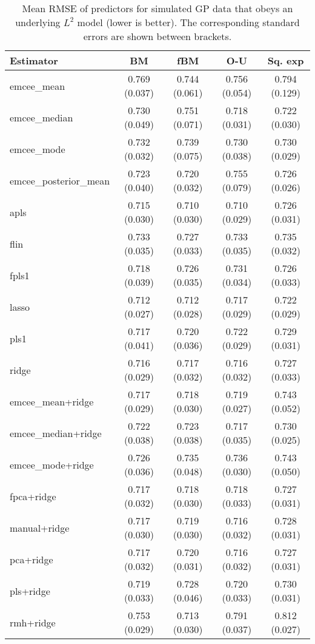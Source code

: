 \newpage

\begin{table}[htbp!]
  \centering
  \begin{tabular}{lcccc}
\toprule
            \textbf{Estimator} &            \textbf{BM} &           \textbf{fBM} &           \textbf{O-U} &        \textbf{Sq. exp} \\
\midrule
          emcee\_mean & 0.769 (0.037) & 0.744 (0.061) & 0.756 (0.054) & 0.794 (0.129) \\
        emcee\_median & 0.730 (0.049) & 0.751 (0.071) & 0.718 (0.031) & 0.722 (0.030) \\
          emcee\_mode & 0.732 (0.032) & 0.739 (0.075) & 0.730 (0.038) & 0.730 (0.029) \\
emcee\_posterior\_mean & 0.723 (0.040) & 0.720 (0.032) & 0.755 (0.079) & 0.726 (0.026) \\
                apls & 0.715 (0.030) & 0.710 (0.030) & 0.710 (0.029) & 0.726 (0.031) \\
                flin & 0.733 (0.035) & 0.727 (0.033) & 0.733 (0.035) & 0.735 (0.032) \\
               fpls1 & 0.718 (0.039) & 0.726 (0.035) & 0.731 (0.034) & 0.726 (0.033) \\
               lasso & 0.712 (0.027) & 0.712 (0.028) & 0.717 (0.029) & 0.722 (0.029) \\
                pls1 & 0.717 (0.041) & 0.720 (0.036) & 0.722 (0.029) & 0.729 (0.031) \\
               ridge & 0.716 (0.029) & 0.717 (0.032) & 0.716 (0.032) & 0.727 (0.033) \\
\bottomrule
\toprule
 emcee\_mean+ridge & 0.717 (0.029) & 0.718 (0.030) & 0.719 (0.027) & 0.743 (0.052) \\
emcee\_median+ridge & 0.722 (0.038) & 0.723 (0.038) & 0.717 (0.035) & 0.730 (0.025) \\
  emcee\_mode+ridge & 0.726 (0.036) & 0.735 (0.048) & 0.736 (0.030) & 0.743 (0.050) \\
        fpca+ridge & 0.717 (0.032) & 0.718 (0.030) & 0.718 (0.033) & 0.727 (0.031) \\
      manual+ridge & 0.717 (0.030) & 0.719 (0.030) & 0.716 (0.032) & 0.728 (0.031) \\
         pca+ridge & 0.717 (0.032) & 0.720 (0.031) & 0.716 (0.032) & 0.727 (0.031) \\
         pls+ridge & 0.719 (0.033) & 0.728 (0.046) & 0.720 (0.033) & 0.730 (0.031) \\
         rmh+ridge & 0.753 (0.029) & 0.713 (0.030) & 0.791 (0.037) & 0.812 (0.027) \\
\bottomrule
\end{tabular}
  \caption{Mean RMSE of predictors for simulated GP data that obeys an underlying \(L^2\) model (lower is better). The corresponding standard errors are shown between brackets.}
\end{table}

